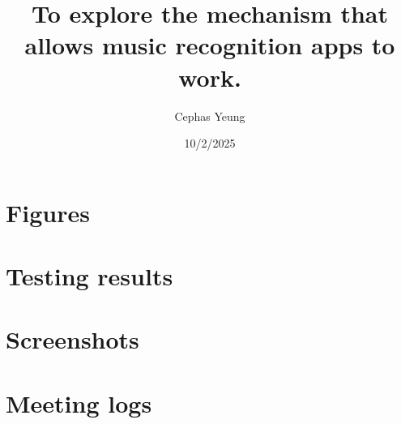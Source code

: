 \documentclass[twoside]{report}
\title{To explore the mechanism that allows music recognition apps to work. }
\author{Cephas Yeung}
\date{10/2/2025}
\begin{document}
\maketitle
\tableofcontents
\newpage


\printbibliography[heading=bibintoc, title={Bibliography}]

\appendix
% 
\chapter{Figures}


\chapter{Testing results}

\chapter{Screenshots}

\chapter{Meeting logs}



\end{document}
